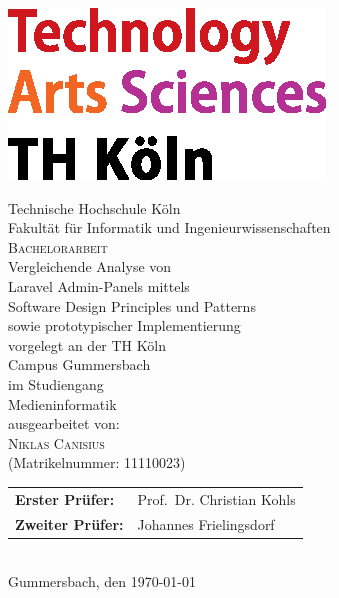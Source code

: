 \pagestyle{empty}
\begin{titlepage}
    \includegraphics[scale=1.0]{assets/logo_TH-Koeln_CMYK_22pt}\\
    \begin{center}
        \large
        Technische Hochschule Köln\\
        Fakultät für Informatik und Ingenieurwissenschaften\\
        \vspace{1cm}
        \large
        \textsc{Bachelorarbeit}\\
        \vspace{1cm}
        \huge
        Vergleichende Analyse von\\
        Laravel Admin-Panels mittels\\
        Software Design Principles und Patterns\\
        sowie prototypischer Implementierung\\
        \vspace{1cm}
        \large
        vorgelegt an der TH Köln\\
        Campus Gummersbach\\
        im Studiengang\\
        Medieninformatik\\
        \vspace{1cm}
        ausgearbeitet von:\\
        \textsc{Niklas Canisius}\\
        (Matrikelnummer: 11110023)\\
        \vspace{1cm}
        \begin{tabular}{ll}
            \textbf{Erster Prüfer:} & Prof.\ Dr. Christian Kohls \\
            \textbf{Zweiter Prüfer:} & Johannes Frielingsdorf \\
        \end{tabular}
        \vspace{1cm}
        \\Gummersbach, den \today
    \end{center}
\end{titlepage}
